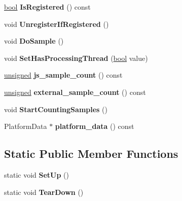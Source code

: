 \begin{DoxyCompactItemize}
\mbox{\label{classv8_1_1sampler_1_1Sampler_a890c41fccfd611ba3c165b3e49b80328}} 
\mbox{\hyperlink{classbool}{bool}} {\bfseries Is\+Registered} () const
\item 
\mbox{\label{classv8_1_1sampler_1_1Sampler_a4cf44fdeafb9c58d73974fcabdac3925}} 
void {\bfseries Unregister\+If\+Registered} ()
\item 
\mbox{\label{classv8_1_1sampler_1_1Sampler_af3006f5fb21631a2c5981df714c59c4c}} 
void {\bfseries Do\+Sample} ()
\item 
\mbox{\label{classv8_1_1sampler_1_1Sampler_aaa36416849ee6f752b102f1d1ef8506b}} 
void {\bfseries Set\+Has\+Processing\+Thread} (\mbox{\hyperlink{classbool}{bool}} value)
\item 
\mbox{\label{classv8_1_1sampler_1_1Sampler_a3df03ac293344f3f698e7e581523d49d}} 
\mbox{\hyperlink{classunsigned}{unsigned}} {\bfseries js\+\_\+sample\+\_\+count} () const
\item 
\mbox{\label{classv8_1_1sampler_1_1Sampler_ac8e4a7e1e2d7f2052cda548899033d54}} 
\mbox{\hyperlink{classunsigned}{unsigned}} {\bfseries external\+\_\+sample\+\_\+count} () const
\item 
\mbox{\label{classv8_1_1sampler_1_1Sampler_ae27a5dd0e2a6dee2a1af0d7e4c4bc7c6}} 
void {\bfseries Start\+Counting\+Samples} ()
\item 
\mbox{\label{classv8_1_1sampler_1_1Sampler_aba05ce70057bd18c47784f42eb311058}} 
Platform\+Data $\ast$ {\bfseries platform\+\_\+data} () const
\end{DoxyCompactItemize}
\subsection*{Static Public Member Functions}
\begin{DoxyCompactItemize}
\item 
\mbox{\label{classv8_1_1sampler_1_1Sampler_a3d9a03d2b67ddadbfdc7e7210cd1d7c8}} 
static void {\bfseries Set\+Up} ()
\item 
\mbox{\label{classv8_1_1sampler_1_1Sampler_a1c17186db2e48cd62c0824aa2c87b551}} 
static void {\bfseries Tear\+Down} ()
\end{DoxyCompactItemize}
